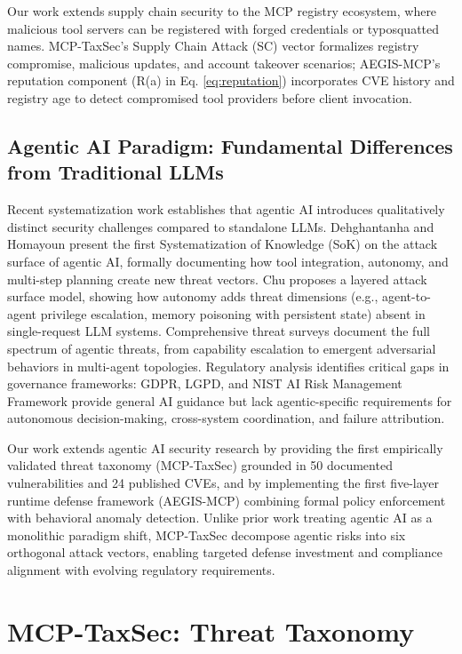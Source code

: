\documentclass[12pt,twocolumn,journal]{IEEEtran}
\begin{document}
Our work extends supply chain security to the MCP registry ecosystem, where malicious tool servers can be registered with forged credentials or typosquatted names. MCP-TaxSec's Supply Chain Attack (SC) vector formalizes registry compromise, malicious updates, and account takeover scenarios; AEGIS-MCP's reputation component (R(a) in Eq. \ref{eq:reputation}) incorporates CVE history and registry age to detect compromised tool providers before client invocation.

\subsection{Agentic AI Paradigm: Fundamental Differences from Traditional LLMs}

Recent systematization work establishes that agentic AI introduces qualitatively distinct security challenges compared to standalone LLMs. Dehghantanha and Homayoun \cite{Dehghantanha2026} present the first Systematization of Knowledge (SoK) on the attack surface of agentic AI, formally documenting how tool integration, autonomy, and multi-step planning create new threat vectors. Chu \cite{Chu2026} proposes a layered attack surface model, showing how autonomy adds threat dimensions (e.g., agent-to-agent privilege escalation, memory poisoning with persistent state) absent in single-request LLM systems. Comprehensive threat surveys \cite{Shahriar2025} document the full spectrum of agentic threats, from capability escalation to emergent adversarial behaviors in multi-agent topologies. Regulatory analysis \cite{Dehghantanha2025} identifies critical gaps in governance frameworks: GDPR, LGPD, and NIST AI Risk Management Framework provide general AI guidance but lack agentic-specific requirements for autonomous decision-making, cross-system coordination, and failure attribution.

Our work extends agentic AI security research by providing the first empirically validated threat taxonomy (MCP-TaxSec) grounded in 50 documented vulnerabilities and 24 published CVEs, and by implementing the first five-layer runtime defense framework (AEGIS-MCP) combining formal policy enforcement with behavioral anomaly detection. Unlike prior work treating agentic AI as a monolithic paradigm shift, MCP-TaxSec decompose agentic risks into six orthogonal attack vectors, enabling targeted defense investment and compliance alignment with evolving regulatory requirements.

\section{MCP-TaxSec: Threat Taxonomy}
\label{sec:taxonomy}
\end{document}

